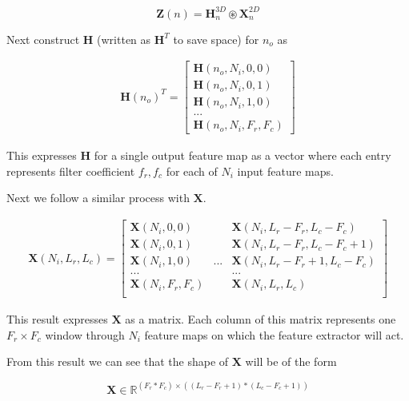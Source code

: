 \documentclass[12pt]{article}
\begin{document}
\begin{equation}
	\boldsymbol{Z}(n) =
	\boldsymbol{H}_n^{3D} \circledast \boldsymbol{X}_n^{2D}
\end{equation}

Next construct $\boldsymbol{H}$ (written as $\boldsymbol{H}^T$ to save space)
for $n_o$ as

\begin{align}
	\boldsymbol{H}(n_o)^T =
	\begin{bmatrix}
		\boldsymbol{H}(n_o, N_i, 0, 0) \\
		\boldsymbol{H}(n_o, N_i, 0, 1) \\
		\boldsymbol{H}(n_o,N_i, 1, 0) \\
		... \\
		\boldsymbol{H}(n_o, N_i, F_r, F_c)
	\end{bmatrix}
\end{align}

This expresses $\boldsymbol{H}$ for a single output feature map as a vector
where each entry represents filter coefficient $f_r, f_c$ for each of $N_i$
input feature maps.
\newline

Next we follow a similar process with $\boldsymbol{X}$.

\begin{align}
	\boldsymbol{X}(N_i, L_r, L_c) =
	\begin{bmatrix}
		\boldsymbol{X}(N_i, 0, 0) && \boldsymbol{X}(N_i, L_r-F_r, L_c-F_c) \\
		\boldsymbol{X}(N_i, 0, 1) && \boldsymbol{X}(N_i, L_r-F_r, L_c-F_c+1)\\
		\boldsymbol{X}(N_i, 1, 0) &...& \boldsymbol{X}(N_i, L_r-F_r+1, L_c-F_c)\\
		... && ... \\
		\boldsymbol{X}(N_i, F_r, F_c) && \boldsymbol{X}(N_i, L_r, L_c)\\
	\end{bmatrix}
\end{align}

This result expresses $\boldsymbol{X}$ as a matrix. Each column of this matrix
represents one $F_r \times F_c$ window through $N_i$ feature maps on which
the feature extractor will act.

From this result we can see that the shape of $\boldsymbol{X}$ will be of the
form

\begin{equation}
	\boldsymbol{X} \in \mathbb{R}^{(F_r*F_c)\times((L_r-F_r+1)*(L_c-F_c+1))}
\end{equation}
\end{document}
